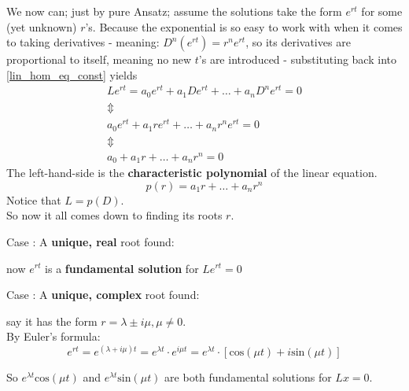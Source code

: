 We now can; just by pure Ansatz; assume the solutions take the form $e^{rt}$ for some (yet unknown) $r$'s. Because the exponential is so easy to work with when it comes to taking derivatives - meaning: $D^n(e^{rt})=r^ne^{rt}$, so its derivatives are proportional to itself, meaning no new $t$'s are introduced - substituting back into \ref{lin_hom_eq_const} yields
\begin{gather*}
	Le^{rt} = a_0 e^{rt} + a_1 De^{rt} + \dots +a_{n} D^ne^{rt} = 0      \\
	\Updownarrow \\
	a_0 e^{rt}+a_1re^{rt} + \dots + a_nr^ne^{rt} =0 \\
	\Updownarrow \\
	a_0 + a_1r + \dots + a_nr^n =0
\end{gather*}
The left-hand-side is the \textbf{characteristic polynomial} of the linear equation.
\begin{equation}\label{lin_eq_char_poly}
	p(r) = a_1r + \dots + a_nr^n
\end{equation}
Notice that $L = p(D)$. \\
So now it all comes down to finding its roots $r$.

Case : A \textbf{unique, real} root found:

now $e^{rt}$ is a \textbf{fundamental solution} for $Le^{rt}=0$

Case : A \textbf{unique, complex} root found:

say it has the form $r = \lambda \pm i\mu, \mu \neq 0$. \\
By Euler's formula:
\begin{equation}\label{euler}
	e^{rt} = e^{(\lambda + i\mu)t} = e^{\lambda t} \cdot e^{i \mu t}  =  e^{\lambda t} \cdot [\text{cos}(\mu t) + i \text{sin}(\mu t)]
\end{equation}

So $e^{\lambda t}\text{cos}(\mu t)$ and $e^{\lambda t}\text{sin}(\mu t)$ are both fundamental solutions for $Lx=0$.


